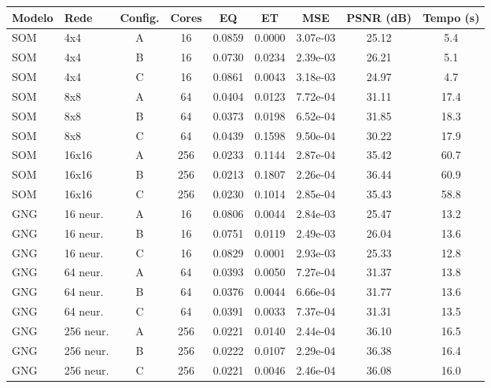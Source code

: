 \begin{tabular}{llccccccc}
\toprule
Modelo & Rede & Config. & Cores & EQ & ET & MSE & PSNR (dB) & Tempo (s)\\
\midrule
SOM & 4x4 & A & 16 & 0.0859 & 0.0000 & 3.07e-03 & 25.12 & 5.4\\
SOM & 4x4 & B & 16 & 0.0730 & 0.0234 & 2.39e-03 & 26.21 & 5.1\\
SOM & 4x4 & C & 16 & 0.0861 & 0.0043 & 3.18e-03 & 24.97 & 4.7\\
\midrule
SOM & 8x8 & A & 64 & 0.0404 & 0.0123 & 7.72e-04 & 31.11 & 17.4\\
SOM & 8x8 & B & 64 & 0.0373 & 0.0198 & 6.52e-04 & 31.85 & 18.3\\
SOM & 8x8 & C & 64 & 0.0439 & 0.1598 & 9.50e-04 & 30.22 & 17.9\\
\midrule
SOM & 16x16 & A & 256 & 0.0233 & 0.1144 & 2.87e-04 & 35.42 & 60.7\\
SOM & 16x16 & B & 256 & 0.0213 & 0.1807 & 2.26e-04 & 36.44 & 60.9\\
SOM & 16x16 & C & 256 & 0.0230 & 0.1014 & 2.85e-04 & 35.43 & 58.8\\
\midrule
GNG & 16 neur. & A & 16 & 0.0806 & 0.0044 & 2.84e-03 & 25.47 & 13.2\\
GNG & 16 neur. & B & 16 & 0.0751 & 0.0119 & 2.49e-03 & 26.04 & 13.6\\
GNG & 16 neur. & C & 16 & 0.0829 & 0.0001 & 2.93e-03 & 25.33 & 12.8\\
\midrule
GNG & 64 neur. & A & 64 & 0.0393 & 0.0050 & 7.27e-04 & 31.37 & 13.8\\
GNG & 64 neur. & B & 64 & 0.0376 & 0.0044 & 6.66e-04 & 31.77 & 13.6\\
GNG & 64 neur. & C & 64 & 0.0391 & 0.0033 & 7.37e-04 & 31.31 & 13.5\\
\midrule
GNG & 256 neur. & A & 256 & 0.0221 & 0.0140 & 2.44e-04 & 36.10 & 16.5\\
GNG & 256 neur. & B & 256 & 0.0222 & 0.0107 & 2.29e-04 & 36.38 & 16.4\\
GNG & 256 neur. & C & 256 & 0.0221 & 0.0046 & 2.46e-04 & 36.08 & 16.0\\
\bottomrule
\end{tabular}

